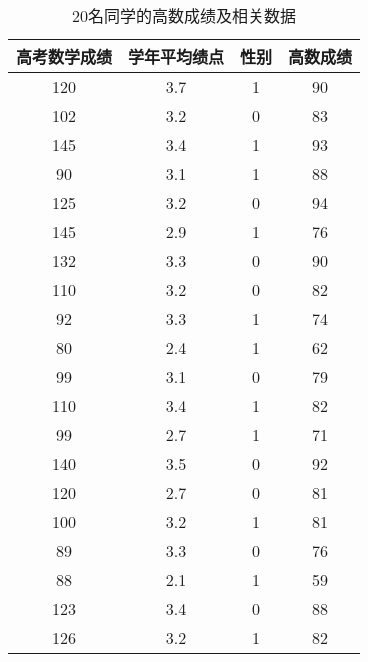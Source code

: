 \documentclass[withoutpreface]{cumcmthesis}
\begin{document}
\begin{table}[H]
  \centering
  \caption{20名同学的高数成绩及相关数据}
    \begin{tabular}{|c|c|c|c|}
    \hline
    \rowcolor[rgb]{ 1,  .753,  0} \textcolor[rgb]{ 1,  1,  1}{高考数学成绩} & \textcolor[rgb]{ 1,  1,  1}{学年平均绩点} & \textcolor[rgb]{ 1,  1,  1}{性别} & \textcolor[rgb]{ 1,  1,  1}{高数成绩} \bigstrut\\
    \hline
    \rowcolor[rgb]{ .859,  .859,  .859} 120   & 3.7   & 1     & 90 \bigstrut\\
    \hline
    \rowcolor[rgb]{ .929,  .929,  .929} 102   & 3.2   & 0     & 83 \bigstrut\\
    \hline
    \rowcolor[rgb]{ .859,  .859,  .859} 145   & 3.4   & 1     & 93 \bigstrut\\
    \hline
    \rowcolor[rgb]{ .929,  .929,  .929} 90    & 3.1   & 1     & 88 \bigstrut\\
    \hline
    \rowcolor[rgb]{ .859,  .859,  .859} 125   & 3.2   & 0     & 94 \bigstrut\\
    \hline
    \rowcolor[rgb]{ .929,  .929,  .929} 145   & 2.9   & 1     & 76 \bigstrut\\
    \hline
    \rowcolor[rgb]{ .859,  .859,  .859} 132   & 3.3   & 0     & 90 \bigstrut\\
    \hline
    \rowcolor[rgb]{ .929,  .929,  .929} 110   & 3.2   & 0     & 82 \bigstrut\\
    \hline
    \rowcolor[rgb]{ .859,  .859,  .859} 92    & 3.3   & 1     & 74 \bigstrut\\
    \hline
    \rowcolor[rgb]{ .929,  .929,  .929} 80    & 2.4   & 1     & 62 \bigstrut\\
    \hline
    \rowcolor[rgb]{ .859,  .859,  .859} 99    & 3.1   & 0     & 79 \bigstrut\\
    \hline
    \rowcolor[rgb]{ .929,  .929,  .929} 110   & 3.4   & 1     & 82 \bigstrut\\
    \hline
    \rowcolor[rgb]{ .859,  .859,  .859} 99    & 2.7   & 1     & 71 \bigstrut\\
    \hline
    \rowcolor[rgb]{ .929,  .929,  .929} 140   & 3.5   & 0     & 92 \bigstrut\\
    \hline
    \rowcolor[rgb]{ .859,  .859,  .859} 120   & 2.7   & 0     & 81 \bigstrut\\
    \hline
    \rowcolor[rgb]{ .929,  .929,  .929} 100   & 3.2   & 1     & 81 \bigstrut\\
    \hline
    \rowcolor[rgb]{ .859,  .859,  .859} 89    & 3.3   & 0     & 76 \bigstrut\\
    \hline
    \rowcolor[rgb]{ .929,  .929,  .929} 88    & 2.1   & 1     & 59 \bigstrut\\
    \hline
    \rowcolor[rgb]{ .859,  .859,  .859} 123   & 3.4   & 0     & 88 \bigstrut\\
    \hline
    \rowcolor[rgb]{ .929,  .929,  .929} 126   & 3.2   & 1     & 82 \bigstrut\\
    \hline
    \end{tabular}
  \label{Tab:2}
\end{table}
\end{document}
